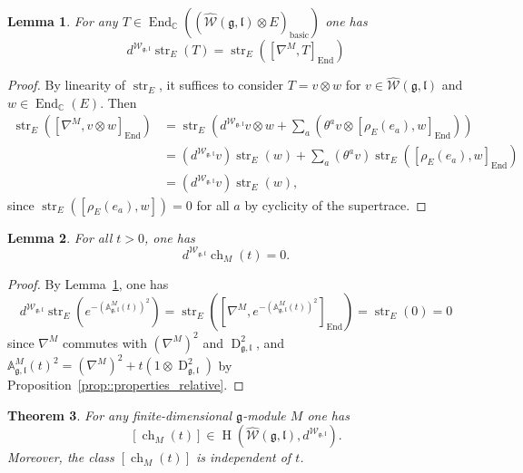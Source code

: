 \documentclass[11pt]{amsart}
\newcommand{\str}{\operatorname{str}}
\newcommand{\End}{\operatorname{End}}
\newcommand{\Dirac}{\operatorname{D}}
\def\CC{{\mathbb C}}
\def\H{{\operatorname{H}}}
\def\ll{{\mathfrak l}}
\def \AA {{\mathbb{A}}}
\def\gg{{\mathfrak{g}}}
\theoremstyle{plain}
\newtheorem{theorem}{Theorem}
\newtheorem{lemma}[theorem]{Lemma}
\theoremstyle{remark}
\theoremstyle{definition}
\numberwithin{equation}{section}
\theoremstyle{remark}
\begin{document}
\begin{lemma} \label{lemm::differential_of_trace}
 For any $T \in \End_{\mathbb{C}}((\widehat{\mathcal{W}}(\gg,\ll) \otimes E)_{\text{basic}})$ one has 
 \[
 d^{\mathcal{W_{\gg,\ll}}}\str_{E}(T)=\str_{E}([\nabla^{M},T]_{\End})
 \]
\end{lemma}

\begin{proof}
 By linearity of $\str_{E}$, it suffices to consider $T=v \otimes w$ for $v\in \widehat{\mathcal{W}}(\gg,\ll)$ and $w \in \End_{\CC}(E)$. Then 
 \[
 \begin{aligned}
 \str_{E}([\nabla^{M},v \otimes w]_{\End}) &=\str_{E}(d^{\mathcal{W}_{\gg,\ll}}v\otimes w + \sum_{a}(\theta^{a}v\otimes [\rho_{E}(e_{a}),w]_{\End})) \\ &=(d^{\mathcal{W}_{\gg,\ll}}v)\str_{E}(w)+ \sum_{a}(\theta^{a}v)\str_{E}([\rho_{E}(e_{a}),w]_{\End})\\ &=(d^{\mathcal{W}_{\gg,\ll}}v)\str_{E}(w),
 \end{aligned}
 \]
 since $\str_{E}([\rho_{E}(e_{a}),w])=0$ for all $a$ by cyclicity of the supertrace.
\end{proof}

\begin{lemma} \label{lemm::differential_chi}
 For all $t > 0$, one has
 \[
d^{\mathcal{W}_{\gg,\ll}}\operatorname{ch}_{M}(t)=0.
 \]
\end{lemma}

\begin{proof}
 By Lemma~\ref{lemm::differential_of_trace}, one has 
 \[
 d^{\mathcal{W}_{\gg,\ll}}\str_{E}(e^{-(\AA^{\!M}_{\gg,\ll}(t))^{2}})=\str_{E}([\nabla^{M}, e^{-(\AA^{\!M}_{\gg,\ll}(t))^{2}}]_{\End})=\str_{E}(0)=0
 \]
 since $\nabla^{M}$ commutes with $(\nabla^{M})^{2}$ and $\Dirac_{\gg,\ll}^{2}$, and $\AA^{\!M}_{\gg,\ll}(t)^{2}=(\nabla^{M})^{2}+t(1\otimes \Dirac_{\gg,\ll}^{2})$ by Proposition~\ref{prop::properties_relative}.
\end{proof}

\begin{theorem} \label{thm::main_Bismut_Quillen}
 For any finite-dimensional $\gg$-module $M$ one has
 \[
[\operatorname{ch}_{M}(t)] \in \H(\widehat{\mathcal{W}}(\gg,\ll), d^{\mathcal{W}_{\gg,\ll}}).
 \]
 Moreover, the class $[\operatorname{ch}_{M}(t)]$ is independent of $t$.
\end{theorem}
\end{document}

